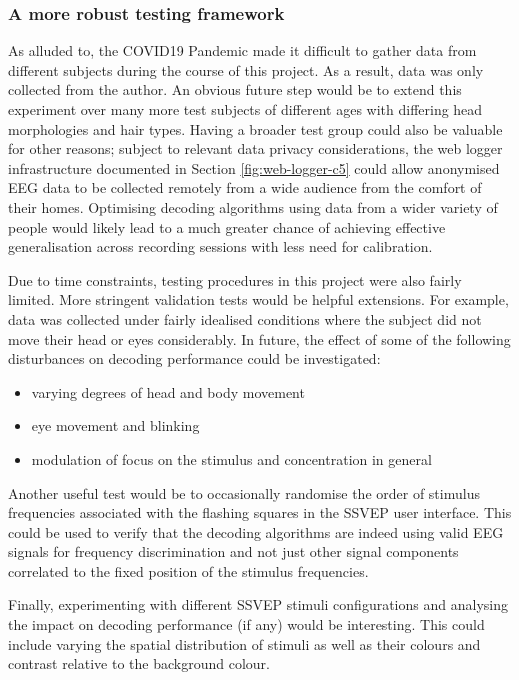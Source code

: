\subsubsection{A more robust testing framework}
As alluded to, the COVID19 Pandemic made it difficult to gather data from different subjects during the course of this project. As a result, data was only collected from the author. An obvious future step would be to extend this experiment over many more test subjects of different ages with differing head morphologies and hair types. Having a broader test group could also be valuable for other reasons; subject to relevant data privacy considerations, the web logger infrastructure documented in Section \ref{fig:web-logger-c5} could allow anonymised EEG data to be collected remotely from a wide audience from the comfort of their homes. Optimising decoding algorithms using data from a wider variety of people would likely lead to a much greater chance of achieving effective generalisation across recording sessions with less need for calibration. 

Due to time constraints, testing procedures in this project were also fairly limited. More stringent validation tests would be helpful extensions. For example, data was collected under fairly idealised conditions where the subject did not move their head or eyes considerably. In future, the effect of some of the following disturbances on decoding performance could be investigated:
\begin{itemize}
    \item varying degrees of head and body movement
    \item eye movement and blinking
    \item modulation of focus on the stimulus and concentration in general
\end{itemize}
Another useful test would be to occasionally randomise the order of stimulus frequencies associated with the flashing squares in the SSVEP user interface. This could be used to verify that the decoding algorithms are indeed using valid EEG signals for frequency discrimination and not just other signal components correlated to the fixed position of the stimulus frequencies. 

Finally, experimenting with different SSVEP stimuli configurations and analysing the impact on decoding performance (if any) would be interesting. This could include varying the spatial distribution of stimuli as well as their colours and contrast relative to the background colour.

